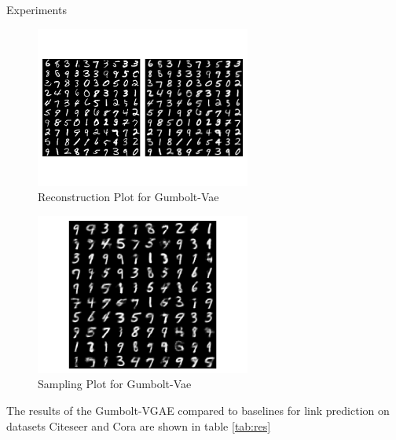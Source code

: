 \documentclass{article}
\begin{document}
\begin{psection}{Experiments}
	\begin{figure}[htpb]
		\centering
		\includegraphics[height=200px, trim={2cm 2cm 2cm 2cm}, clip]{includes/plots/gumbolt-vae/mnist/regenerated.png}
		\caption{Reconstruction Plot for Gumbolt-Vae}
		\label{fig:recon}
	\end{figure}
	\begin{figure}[htpb]
		\centering
		\includegraphics[height=200px]{includes/plots/gumbolt-vae/mnist/sampled.png}
		\caption{Sampling Plot for Gumbolt-Vae}
		\label{fig:sample}
	\end{figure}

	The results of the Gumbolt-VGAE compared to baselines for link prediction on datasets Citeseer and Cora are shown in table \ref{tab:res}
	\fontsize{7.5pt}{7.2}\selectfont
\end{psection}

\newpage



\end{document}
